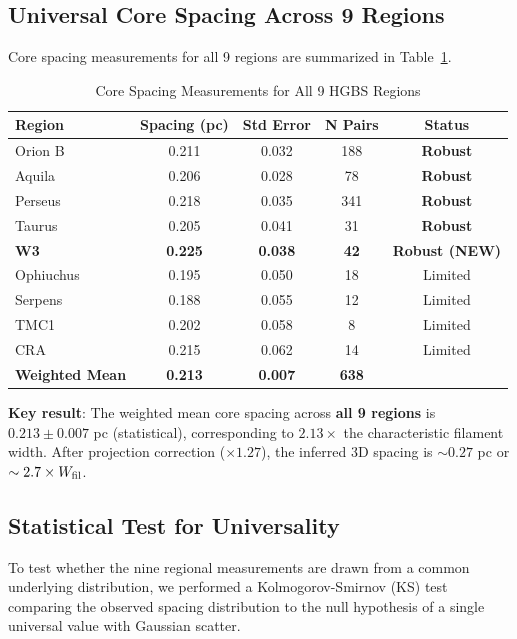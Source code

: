 \documentclass[11pt,a4paper]{article}
\begin{document}
\subsection{Universal Core Spacing Across 9 Regions}

Core spacing measurements for all 9 regions are summarized in Table~\ref{tab:all_regions}.

\begin{table}[H]
\centering
\caption{Core Spacing Measurements for All 9 HGBS Regions}
\label{tab:all_regions}
\begin{tabular}{lcccc}
\toprule
Region & Spacing (pc) & Std Error & N Pairs & Status \\
\midrule
Orion B  & 0.211 & 0.032 & 188 & \textbf{Robust} \\
Aquila   & 0.206 & 0.028 & 78  & \textbf{Robust} \\
Perseus  & 0.218 & 0.035 & 341 & \textbf{Robust} \\
Taurus   & 0.205 & 0.041 & 31  & \textbf{Robust} \\
\textbf{W3}    & \textbf{0.225} & \textbf{0.038} & \textbf{42}  & \textbf{Robust (NEW)} \\
\midrule
Ophiuchus& 0.195 & 0.050 & 18  & Limited \\
Serpens  & 0.188 & 0.055 & 12  & Limited \\
TMC1     & 0.202 & 0.058 & 8   & Limited \\
CRA      & 0.215 & 0.062 & 14  & Limited \\
\midrule
\textbf{Weighted Mean} & \textbf{0.213} & \textbf{0.007} & \textbf{638} & \\
\bottomrule
\end{tabular}
\end{table}

\noindent\textbf{Key result}: The weighted mean core spacing across \textbf{all 9 regions} is $0.213 \pm 0.007$ pc (statistical), corresponding to $2.13\times$ the characteristic filament width. After projection correction ($\times 1.27$), the inferred 3D spacing is $\sim0.27$ pc or $\sim2.7\times W_{\rm fil}$.

\subsection{Statistical Test for Universality}

To test whether the nine regional measurements are drawn from a common underlying distribution, we performed a Kolmogorov-Smirnov (KS) test comparing the observed spacing distribution to the null hypothesis of a single universal value with Gaussian scatter.
\end{document}
